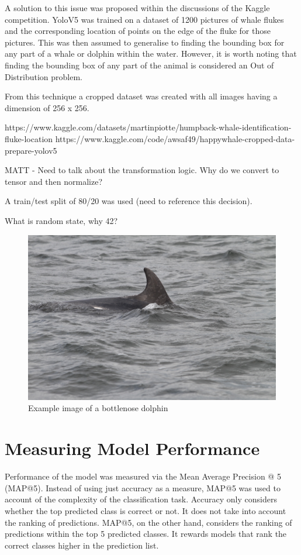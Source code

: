 \documentclass{article}
\begin{document}
A solution to this issue was proposed within the discussions of the Kaggle competition. YoloV5 was trained on a dataset of 1200 pictures of whale flukes and the corresponding location of points on the edge of the fluke for those pictures. 
This was then assumed to generalise to finding the bounding box for any part of a whale or dolphin within the water. However, it is worth noting that finding the bounding box of any part of the animal is considered an Out of Distribution problem. 

From this technique a cropped dataset was created with all images having a dimension of 256 x 256. 

https://www.kaggle.com/datasets/martinpiotte/humpback-whale-identification-fluke-location
https://www.kaggle.com/code/awsaf49/happywhale-cropped-data-prepare-yolov5


MATT - Need to talk about the transformation logic. Why do we convert to tensor and then normalize?

A train/test split of 80/20 was used (need to reference this decision). 

What is random state, why 42?

\begin{figure}
    \includegraphics[width=\linewidth]{example_train.jpg}
    \caption{Example image of a bottlenose dolphin}
    \label{fig:example_train}
\end{figure}

\section{Measuring Model Performance}

Performance of the model was measured via the Mean Average Precision @ 5 (MAP@5). Instead of using just accuracy as a measure, MAP@5 was used to account of the complexity of the
classification task. Accuracy only considers whether the top predicted class is correct or not. It does not take into account the ranking of predictions. 
MAP@5, on the other hand, considers the ranking of predictions within the top 5 predicted classes. It rewards models that rank the correct classes higher in the prediction list.
\end{document}
